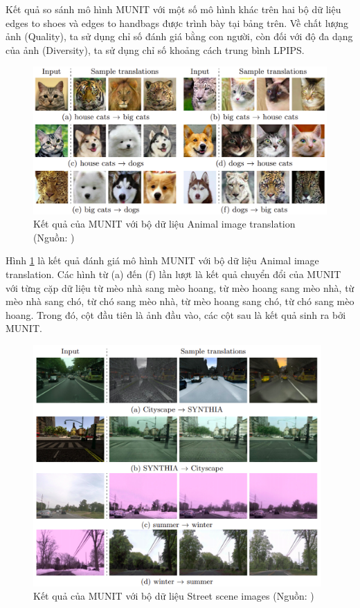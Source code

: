 {	\noindent Kết quả so sánh mô hình MUNIT với một số mô hình khác trên hai bộ dữ liệu edges to shoes và edges to handbags được trình bày tại bảng trên. Về chất lượng ảnh (Quality), ta sử dụng chỉ số đánh giá bằng con người, còn đối với độ đa dạng của ảnh (Diversity), ta sử dụng chỉ số khoảng cách trung bình LPIPS.

    \begin{figure}[H]
    \centering
    \includegraphics[width=12cm] {images/result_munit_animal.png}
    \caption{Kết quả của MUNIT với bộ dữ liệu Animal image translation (Nguồn: \cite{munit})}
    \label{fig:result_munit_animal}
    \end{figure}
    
     \noindent Hình \ref{fig:result_munit_animal} là kết quả đánh giá mô hình MUNIT với bộ dữ liệu Animal image translation. Các hình từ (a) đến (f) lần lượt là kết quả chuyển đổi của MUNIT với từng cặp dữ liệu từ mèo nhà sang mèo hoang, từ mèo hoang sang mèo nhà, từ mèo nhà sang chó, từ chó sang mèo nhà, từ mèo hoang sang chó, từ chó sang mèo hoang. Trong đó, cột đầu tiên là ảnh đầu vào, các cột sau là kết quả sinh ra bởi MUNIT.

    \begin{figure}[H]
    \centering
    \includegraphics[width=11cm] {images/result_munit_city.png}
    \caption{Kết quả của MUNIT với bộ dữ liệu Street scene images (Nguồn: \cite{munit})}
    \label{fig:result_munit_city}
    \end{figure}

}

